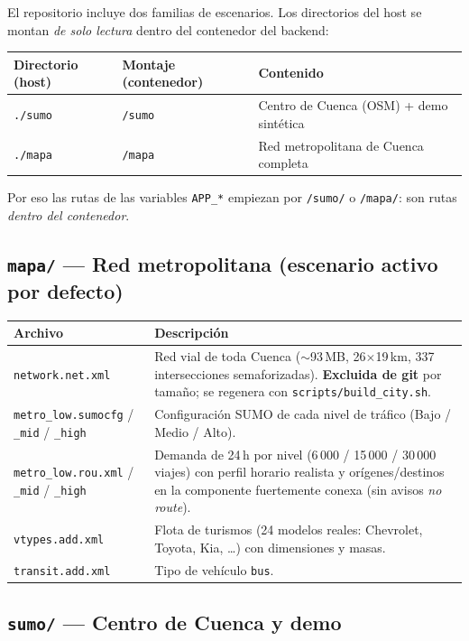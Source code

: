 \documentclass[11pt,a4paper]{article}
\begin{document}
El repositorio incluye dos familias de escenarios. Los directorios del host se
montan \emph{de solo lectura} dentro del contenedor del backend:

\begin{longtable}{@{}lll@{}}
\toprule
\textbf{Directorio (host)} & \textbf{Montaje (contenedor)} & \textbf{Contenido} \\
\midrule
\texttt{./sumo} & \texttt{/sumo} & Centro de Cuenca (OSM) + demo sintética \\
\texttt{./mapa} & \texttt{/mapa} & Red metropolitana de Cuenca completa \\
\bottomrule
\end{longtable}

Por eso las rutas de las variables \texttt{APP\_*} empiezan por \texttt{/sumo/}
o \texttt{/mapa/}: son rutas \emph{dentro del contenedor}.

\subsection{\texttt{mapa/} --- Red metropolitana (escenario activo por defecto)}

\begin{longtable}{@{}p{5.6cm}p{8.9cm}@{}}
\toprule
\textbf{Archivo} & \textbf{Descripción} \\
\midrule
\texttt{network.net.xml} & Red vial de toda Cuenca ($\sim$93\,MB, 26$\times$19\,km,
  337 intersecciones semaforizadas). \textbf{Excluida de git} por tamaño; se
  regenera con \texttt{scripts/build\_city.sh}. \\
\texttt{metro\_low.sumocfg} / \texttt{\_mid} / \texttt{\_high} & Configuración
  SUMO de cada nivel de tráfico (Bajo / Medio / Alto). \\
\texttt{metro\_low.rou.xml} / \texttt{\_mid} / \texttt{\_high} & Demanda de 24\,h
  por nivel (6\,000 / 15\,000 / 30\,000 viajes) con perfil horario realista y
  orígenes/destinos en la componente fuertemente conexa (sin avisos
  \emph{no route}). \\
\texttt{vtypes.add.xml} & Flota de turismos (24 modelos reales: Chevrolet,
  Toyota, Kia, \ldots) con dimensiones y masas. \\
\texttt{transit.add.xml} & Tipo de vehículo \texttt{bus}. \\
\bottomrule
\end{longtable}

\subsection{\texttt{sumo/} --- Centro de Cuenca y demo}
\end{document}
